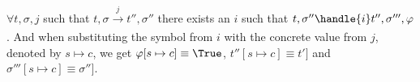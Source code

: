 \begin{lemma}
  $\forall t,\sigma,j$ such that $t,\sigma \xrightarrow[]{j} t'',\sigma''$
  there exists an $i$ such that $t,\sigma''\handle{i} t'',\sigma''',\phi$. And when substituting the symbol from $i$ with the concrete value from $j$, denoted by $s\mapsto c$, we get $\phi[s\mapsto c]\equiv\True$, $t''[s\mapsto c]\equiv t']$ and $\sigma'''[s\mapsto c]\equiv\sigma'']$.
\end{lemma}

\begin{lemma}
\end{lemma}
